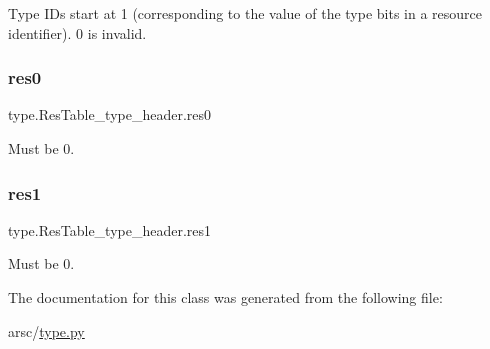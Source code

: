 Type I\+Ds start at 1 (corresponding to the value of the type bits in a resource identifier). 0 is invalid. \mbox{\label{classtype_1_1ResTable__type__header_a067afa789aff346656808f653a5888d3}} 
\subsubsection{\texorpdfstring{res0}{res0}}
{\footnotesize\ttfamily type.\+Res\+Table\+\_\+type\+\_\+header.\+res0}



Must be 0. 

\mbox{\label{classtype_1_1ResTable__type__header_a8c51b10f036c581084351d47e34d3e01}} 
\subsubsection{\texorpdfstring{res1}{res1}}
{\footnotesize\ttfamily type.\+Res\+Table\+\_\+type\+\_\+header.\+res1}



Must be 0. 



The documentation for this class was generated from the following file\+:\begin{DoxyCompactItemize}
\item 
arsc/\mbox{\hyperlink{type_8py}{type.\+py}}\end{DoxyCompactItemize}
